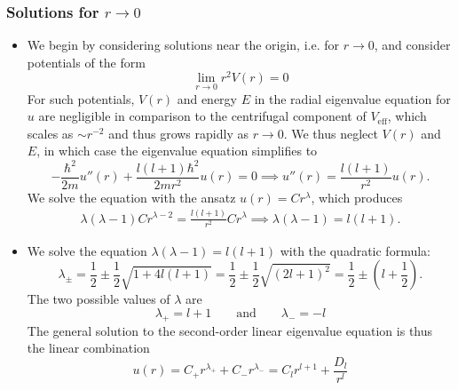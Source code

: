 \documentclass[11pt, a4paper]{article}
\newcommand{\eqtext}[1]{\qquad \text{#1} \qquad}
\begin{document}
\subsubsection{Solutions for $ r \to 0 $}
\begin{itemize}
	\item We begin by considering solutions near the origin, i.e. for $ r \to 0 $, and consider potentials of the form
	\begin{equation*}
		\lim_{r \to 0}r^{2}V(r) = 0
	\end{equation*}
    For such potentials, $ V(r) $ and energy $ E $ in the radial eigenvalue equation for $ u $ are negligible in comparison to the centrifugal component of $ V_{\text{eff}} $, which scales as $ \sim r^{-2} $ and thus grows rapidly as $ r \to 0 $. We thus neglect $ V(r) $ and $ E $, in which case the eigenvalue equation simplifies to
	\begin{equation*}
		-\frac{\hbar^{2}}{2m}u''(r) + \frac{l (l+1)\hbar^{2}}{2mr^{2}}u(r) = 0 \implies u''(r) = \frac{l (l+1)}{r^{2}}u(r).
	\end{equation*}
	We solve the equation with the ansatz $ u(r) = Cr^{\lambda} $, which produces
	\begin{align*}
		\lambda (\lambda - 1)Cr^{\lambda-2} = \frac{l (l+1)}{r^{2}}Cr^{\lambda} \implies 	\lambda (\lambda - 1) = l (l+1).
	\end{align*}
	
	\item We solve the equation $ \lambda (\lambda - 1) = l (l+1) $ with the quadratic formula:
	\begin{equation*}
		\lambda_{\pm} = \frac{1}{2} \pm \frac{1}{2}\sqrt{1 + 4l (l+1)} = \frac{1}{2} \pm \frac{1}{2}\sqrt{(2l+1)^{2}}  = \frac{1}{2} \pm \left(l + \frac{1}{2}\right).
	\end{equation*}
	The two possible values of $ \lambda $ are
	\begin{equation*}
		\lambda_{+} = l + 1 \eqtext{and} \lambda_{-} = -l
	\end{equation*}
	The general solution to the second-order linear eigenvalue equation is thus the linear combination
	\begin{equation*}
		u(r) = C_{+}r^{\lambda_{+}} + C_{-}r^{\lambda_{-}} = C_{l}r^{l+1} + \frac{D_{l}}{r^{l}}
	\end{equation*}
	

\end{itemize}
\end{document}
